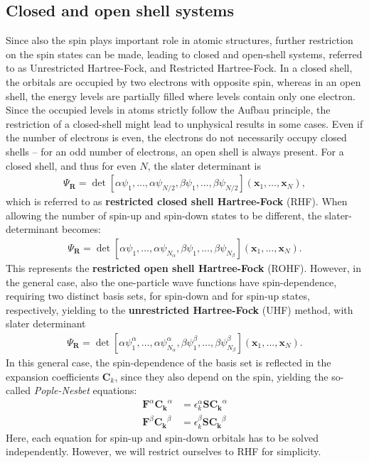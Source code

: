 \documentclass[twoside,        %
			   11pt,			%
               BCOR10mm,       %
               ngerman,english  %
               ]{scrartcl}
\begin{document}
\subsection{Closed and open shell systems}    
Since also the spin plays important role in atomic structures, further restriction on the spin states can be made, leading to closed and open-shell systems, referred to as Unrestricted Hartree-Fock, and Restricted Hartree-Fock. In a closed shell, the orbitals are occupied by two electrons with opposite spin, whereas in an open shell, the energy levels are partially filled where levels contain only one electron. Since the occupied levels in atoms strictly follow the Aufbau principle, the restriction of a closed-shell might lead to unphysical results in some cases. Even if the number of electrons is even, the electrons do not necessarily occupy closed shells -- for an odd number of electrons, an open shell is always present.
For a closed shell, and thus for even $N$, the slater determinant is
\begin{align*}
\Psi_\textbf{R} = \det \left[\alpha \psi_1, \dots, \alpha\psi_{N/2}, \beta \psi_1, \dots, \beta\psi_{N/2} \right] (\mathbf{x}_1, \dots, \mathbf{x}_N) , 
\end{align*} which is referred to as \textbf{restricted closed shell Hartree-Fock} (RHF).
When allowing the number of spin-up and spin-down states to be different, the slater-determinant becomes:
\begin{align*}
\Psi_\textbf{R} = \det \left[\alpha \psi_1, \dots, \alpha\psi_{N_\alpha}, \beta \psi_1, \dots, \beta\psi_{N_\beta} \right] (\mathbf{x}_1, \dots, \mathbf{x}_N).
\end{align*} This represents the \textbf{restricted open shell Hartree-Fock} (ROHF).
However, in the general case, also the one-particle wave functions have spin-dependence, requiring two distinct basis sets, for spin-down and for spin-up states, respectively, yielding to the \textbf{unrestricted Hartree-Fock} (UHF) method, with slater determinant
\begin{align*}
\Psi_\textbf{R} = \det \left[\alpha \psi_1^\alpha, \dots, \alpha\psi_{N_\alpha}^\alpha, \beta \psi_1^\beta, \dots, \beta\psi_{N_\beta}^\beta \right] (\mathbf{x}_1, \dots, \mathbf{x}_N).
\end{align*}
In this general case, the spin-dependence of the basis set is reflected in the expansion coefficients $\mathbf{C}_k$, since they also depend on the spin, yielding the so-called \emph{Pople-Nesbet} equations:
\begin{align*}
\mathbf{F}^\alpha \mathbf{C_k}^\alpha &= \epsilon_k^\alpha \mathbf{S} \mathbf{C_k}^\alpha \\
\mathbf{F}^\beta \mathbf{C_k}^\beta &= \epsilon_k^\beta \mathbf{S} \mathbf{C_k}^\beta
\end{align*}
Here, each equation for spin-up and spin-down orbitals has to be solved independently. However, we will restrict ourselves to RHF for simplicity.
\end{document}
